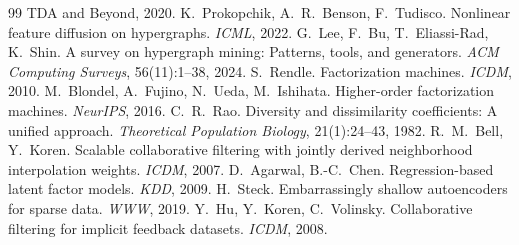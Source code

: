 \documentclass[10pt]{article}
\begin{document}
\begin{thebibliography}{99}
{TDA and Beyond}, 2020.
 K.~Prokopchik, A.~R.~Benson, F.~Tudisco. Nonlinear feature diffusion on hypergraphs.
\emph{ICML}, 2022.
 G.~Lee, F.~Bu, T.~Eliassi-Rad, K.~Shin. A survey on hypergraph mining: Patterns, tools, and
generators. \emph{ACM Computing Surveys}, 56(11):1--38, 2024.
 S.~Rendle. Factorization machines. \emph{ICDM}, 2010.
 M.~Blondel, A.~Fujino, N.~Ueda, M.~Ishihata. Higher-order factorization machines.
\emph{NeurIPS}, 2016.
 C.~R.~Rao. Diversity and dissimilarity coefficients: A unified approach. \emph{Theoretical
Population Biology}, 21(1):24--43, 1982.
 R.~M.~Bell, Y.~Koren. Scalable collaborative filtering with jointly derived neighborhood
interpolation weights. \emph{ICDM}, 2007.
 D.~Agarwal, B.-C.~Chen. Regression-based latent factor models. \emph{KDD}, 2009.
 H.~Steck. Embarrassingly shallow autoencoders for sparse data. \emph{WWW}, 2019.
 Y.~Hu, Y.~Koren, C.~Volinsky. Collaborative filtering for implicit feedback datasets.
\emph{ICDM}, 2008.
\end{thebibliography}
\end{document}
